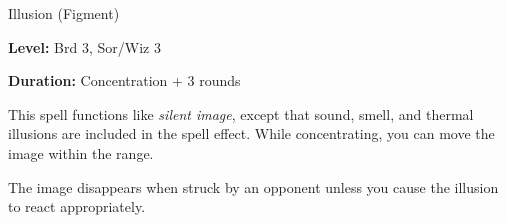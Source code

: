 
Illusion (Figment)

\textbf{Level:} Brd 3, Sor/Wiz 3

\textbf{Duration:} Concentration + 3 rounds

This spell functions like \textit{silent image}, except that sound, smell, and 
thermal illusions are included in the spell effect. While concentrating, you can 
move the image within the range. 

The image disappears when struck by an opponent unless you cause the illusion to 
react appropriately.

